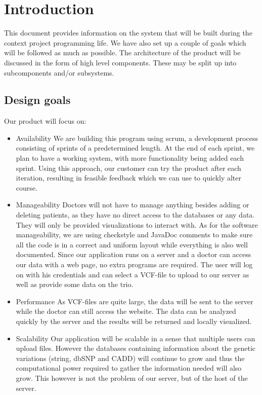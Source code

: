 \section{Introduction}
	This document provides information on the system that will be built during the context project programming life. We have also set up a couple of goals which will be followed as much as possible. The architecture of the product will be discussed in the form of high level components. These may be split up into subcomponents and/or subsystems.
	\subsection{Design goals}
	Our product will focus on:
	\begin{itemize}
		\item Availability
			\subitem We are building this program using scrum, a development process consisting of sprints of a predetermined length. At the end of each sprint, we plan to have a working system, with more functionality being added each sprint. Using this approach, our customer can try the product after each iteration, resulting in feasible feedback which we can use to quickly alter course.
		\item Manageability
			\subitem Doctors will not have to manage anything besides adding or deleting patients, as they have no direct access to the databases or any data. They will only be provided visualizations to interact with. 
			\subitem As for the software manageability, we are using checkstyle and JavaDoc comments to make sure all the code is in a correct and uniform layout while everything is also well documented.
			\subitem Since our application runs on a server and a doctor can access our data with a web page, no extra programs are required. The user will log on with his credentials and can select a VCF-file to upload to our server as well as provide some data on the trio.
		\item Performance
			\subitem As VCF-files are quite large, the data will be sent to the server while the doctor can still access the website. The data can be analyzed quickly by the server and the results will be returned and locally visualized.
		\item Scalability
			\subitem Our application will be scalable in a sense that multiple users can upload files. However the databases containing information about the genetic variations (string, dbSNP and CADD) will continue to grow and thus the computational power required to gather the information needed will also grow. This however is not the problem of our server, but of the host of the server.

\end{itemize}
